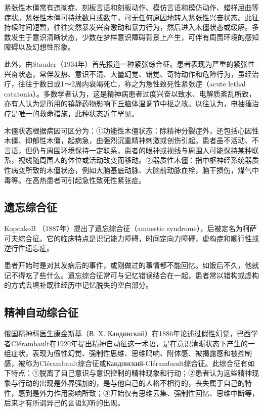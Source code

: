 紧张性木僵常有违拗症、刻板言语和刻板动作、模仿言语和模仿动作、蜡样屈曲等症状。紧张性木僵可持续数月或数年，可无任何原因地转入紧张性兴奋状态。此征持续时间短暂，往往突然暴发兴奋激动和暴力行为，然后进入木僵状态或缓解。多数发生于意识清晰状态，少数在梦样意识障碍背景上产生，可伴有周围环境的感知障碍以及幻想性形象。

此外，由Stauder（1934年）首先报道一种紧张综合征。患者表现为严重的紧张性兴奋状态，常伴发热、意识不清、大量幻觉、错觉、奇特动作和危险行为，虽经治疗，往往于数日或1～2周内衰竭死亡，称之为急性致死性紧张症（acute
lethal
catatonia）。多数学者认为，这是精神病患者过度兴奋以致水、电解质紊乱所致，亦有人认为是所用的镇静药物影响下丘脑体温调节中枢之故。以往认为，电抽搐治疗是唯一的救命措施，此种状态近年罕见。

木僵状态根据病因可区分为：①功能性木僵状态：除精神分裂症外，还包括心因性木僵、抑郁性木僵，起病急，由强烈沉重精神刺激或创伤引起。患者虽不活动、不言语，但仍与周围环境保持一定联系，患者的眼神或视线与周围人可能保持某种联系，视线随周围人的体位或活动改变而移动。②器质性木僵：指中枢神经系统器质性病变所致的木僵状态，例如大脑基底动脉、大脑前动脉血栓，脑干损伤，煤气中毒等。在高热患者可引起急性致死性紧张症。

\subsection{遗忘综合征}

Kopcako{B} （1887年）提出了遗忘综合征（amnestic
syndrome），后被定名为柯萨可夫综合征。它的临床特点是识记能力障碍，时间定向力障碍，虚构症和顺行性或逆行性遗忘症。

患者开始时是对其发病后的事件，或刚做过的事情都不能回忆。如饭后不久，他就记不得吃了些什么。遗忘综合征常可与记忆错误结合在一起，患者常以错构或虚构的方式去填补既往经历中记忆脱失的空白部分。

\subsection{精神自动综合征}

俄国精神科医生康金斯基（В. X.
Кандинский）在1886年论述过假性幻觉，巴西学者Clérambault在1920年提出精神自动征这一术语，是在意识清晰状态下产生的一组症状，表现为假性幻觉、强制性思维、思维鸣响、附体感、被揭露感和被控制感，被称为Clérambault综合征或Кандинский-Clérambault综合征。此综合征有如下特点：①脱离了自己意识与意识控制的精神现象和行动；②患者认为这些精神现象与行动的出现是外界强加的，是与他自己的人格不相符的，丧失属于自己的特性，感到是外力作用影响所致；③开始仅有思维云集、强制性回忆、思维中断等，后来才有所谓异己的言语幻听的出现。

